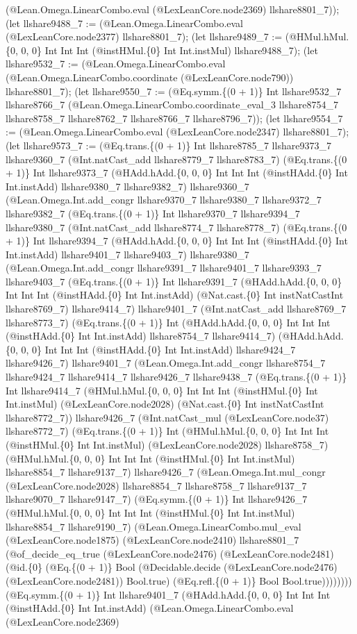 \documentclass[11pt]{article}
\begin{document}
(@Lean.Omega.LinearCombo.eval (@LexLeanCore.node2369) llshare8801\_7)); (let llshare9488\_7 := (@Lean.Omega.LinearCombo.eval (@LexLeanCore.node2377) llshare8801\_7); (let llshare9489\_7 := (@HMul.hMul.\{0, 0, 0\} Int Int Int (@instHMul.\{0\} Int Int.instMul) llshare9488\_7); (let llshare9532\_7 := (@Lean.Omega.LinearCombo.eval (@Lean.Omega.LinearCombo.coordinate (@LexLeanCore.node790)) llshare8801\_7); (let llshare9550\_7 := (@Eq.symm.\{(0 + 1)\} Int llshare9532\_7 llshare8766\_7 (@Lean.Omega.LinearCombo.coordinate\_eval\_3 llshare8754\_7 llshare8758\_7 llshare8762\_7 llshare8766\_7 llshare8796\_7)); (let llshare9554\_7 := (@Lean.Omega.LinearCombo.eval (@LexLeanCore.node2347) llshare8801\_7); (let llshare9573\_7 := (@Eq.trans.\{(0 + 1)\} Int llshare8785\_7 llshare9373\_7 llshare9360\_7 (@Int.natCast\_add llshare8779\_7 llshare8783\_7) (@Eq.trans.\{(0 + 1)\} Int llshare9373\_7 (@HAdd.hAdd.\{0, 0, 0\} Int Int Int (@instHAdd.\{0\} Int Int.instAdd) llshare9380\_7 llshare9382\_7) llshare9360\_7 (@Lean.Omega.Int.add\_congr llshare9370\_7 llshare9380\_7 llshare9372\_7 llshare9382\_7 (@Eq.trans.\{(0 + 1)\} Int llshare9370\_7 llshare9394\_7 llshare9380\_7 (@Int.natCast\_add llshare8774\_7 llshare8778\_7) (@Eq.trans.\{(0 + 1)\} Int llshare9394\_7 (@HAdd.hAdd.\{0, 0, 0\} Int Int Int (@instHAdd.\{0\} Int Int.instAdd) llshare9401\_7 llshare9403\_7) llshare9380\_7 (@Lean.Omega.Int.add\_congr llshare9391\_7 llshare9401\_7 llshare9393\_7 llshare9403\_7 (@Eq.trans.\{(0 + 1)\} Int llshare9391\_7 (@HAdd.hAdd.\{0, 0, 0\} Int Int Int (@instHAdd.\{0\} Int Int.instAdd) (@Nat.cast.\{0\} Int instNatCastInt llshare8769\_7) llshare9414\_7) llshare9401\_7 (@Int.natCast\_add llshare8769\_7 llshare8773\_7) (@Eq.trans.\{(0 + 1)\} Int (@HAdd.hAdd.\{0, 0, 0\} Int Int Int (@instHAdd.\{0\} Int Int.instAdd) llshare8754\_7 llshare9414\_7) (@HAdd.hAdd.\{0, 0, 0\} Int Int Int (@instHAdd.\{0\} Int Int.instAdd) llshare9424\_7 llshare9426\_7) llshare9401\_7 (@Lean.Omega.Int.add\_congr llshare8754\_7 llshare9424\_7 llshare9414\_7 llshare9426\_7 llshare9438\_7 (@Eq.trans.\{(0 + 1)\} Int llshare9414\_7 (@HMul.hMul.\{0, 0, 0\} Int Int Int (@instHMul.\{0\} Int Int.instMul) (@LexLeanCore.node2028) (@Nat.cast.\{0\} Int instNatCastInt llshare8772\_7)) llshare9426\_7 (@Int.natCast\_mul (@LexLeanCore.node37) llshare8772\_7) (@Eq.trans.\{(0 + 1)\} Int (@HMul.hMul.\{0, 0, 0\} Int Int Int (@instHMul.\{0\} Int Int.instMul) (@LexLeanCore.node2028) llshare8758\_7) (@HMul.hMul.\{0, 0, 0\} Int Int Int (@instHMul.\{0\} Int Int.instMul) llshare8854\_7 llshare9137\_7) llshare9426\_7 (@Lean.Omega.Int.mul\_congr (@LexLeanCore.node2028) llshare8854\_7 llshare8758\_7 llshare9137\_7 llshare9070\_7 llshare9147\_7) (@Eq.symm.\{(0 + 1)\} Int llshare9426\_7 (@HMul.hMul.\{0, 0, 0\} Int Int Int (@instHMul.\{0\} Int Int.instMul) llshare8854\_7 llshare9190\_7) (@Lean.Omega.LinearCombo.mul\_eval (@LexLeanCore.node1875) (@LexLeanCore.node2410) llshare8801\_7 (@of\_decide\_eq\_true (@LexLeanCore.node2476) (@LexLeanCore.node2481) (@id.\{0\} (@Eq.\{(0 + 1)\} Bool (@Decidable.decide (@LexLeanCore.node2476) (@LexLeanCore.node2481)) Bool.true) (@Eq.refl.\{(0 + 1)\} Bool Bool.true)))))))) (@Eq.symm.\{(0 + 1)\} Int llshare9401\_7 (@HAdd.hAdd.\{0, 0, 0\} Int Int Int (@instHAdd.\{0\} Int Int.instAdd) (@Lean.Omega.LinearCombo.eval (@LexLeanCore.node2369) 
\end{document}
